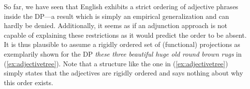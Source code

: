 So far, we have seen that English exhibits a strict ordering of adjective phrases inside the DP---a result which is simply an empirical generalization and can hardly be denied. Additionally, it seems as if an adjunction approach is not capable of explaining these restrictions as it would predict the order to be absent. It is thus plausible to assume a rigidly ordered set of (functional) projections as exemplarily shown for the DP \textit{these three beautiful huge old round brown rugs} in (\ref{ex:adjectivetree}). Note that a structure like the one in (\ref{ex:adjectivetree}) simply states that the adjectives are rigidly ordered and says nothing about why this order exists. 




\begin{exe}
\ex \label{ex:adjectivetree}
\begin{adjustbox}{max width=0.9\textwidth}
\end{adjustbox}
\end{exe}

